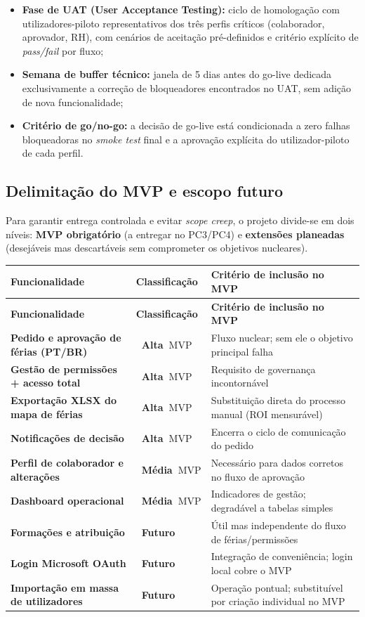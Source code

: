 \documentclass[11pt,a4paper,twoside]{article}
\newcommand{\taghi}  {{\setlength{\fboxsep}{1.5pt}\colorbox{TAGHI}  {\scriptsize\sffamily\bfseries\color{white}~Alta~}}}
\newcommand{\tagmed} {{\setlength{\fboxsep}{1.5pt}\colorbox{TAGMED} {\scriptsize\sffamily\bfseries\color{white}~Média~}}}
\newcommand{\tagn}[1]{{\setlength{\fboxsep}{1.5pt}\colorbox{TAGNEUTRAL}{\scriptsize\sffamily\bfseries\color{white}~#1~}}}
\newcommand{\tH}[1]{\textbf{\sffamily\small\color{white}#1}}
\newcommand{\theadrow}{\rowcolor{ACCENT}}
\begin{document}
\begin{itemize}
  \item \textbf{Fase de UAT (User Acceptance Testing):} ciclo de homologação com utilizadores-piloto representativos dos três perfis críticos (colaborador, aprovador, RH), com cenários de aceitação pré-definidos e critério explícito de \textit{pass/fail} por fluxo;
  \item \textbf{Semana de buffer técnico:} janela de 5 dias antes do go-live dedicada exclusivamente a correção de bloqueadores encontrados no UAT, sem adição de nova funcionalidade;
  \item \textbf{Critério de go/no-go:} a decisão de go-live está condicionada a zero falhas bloqueadoras no \textit{smoke test} final e a aprovação explícita do utilizador-piloto de cada perfil.
\end{itemize}

\subsection{Delimitação do MVP e escopo futuro}

Para garantir entrega controlada e evitar \textit{scope creep}, o projeto divide-se em dois níveis: \textbf{MVP obrigatório} (a entregar no PC3/PC4) e \textbf{extensões planeadas} (desejáveis mas descartáveis sem comprometer os objetivos nucleares).

\begin{longtable}{>{\small\bfseries}p{4.2cm} >{\small\centering\arraybackslash}p{2.0cm} >{\small}p{7.8cm}}
\theadrow
\tH{Funcionalidade} & \tH{Classificação} & \tH{Critério de inclusão no MVP} \\
\midrule
\endfirsthead
\theadrow
\tH{Funcionalidade} & \tH{Classificação} & \tH{Critério de inclusão no MVP} \\
\midrule
\endhead
Pedido e aprovação de férias (PT/BR) & \taghi MVP & Fluxo nuclear; sem ele o objetivo principal falha \\
Gestão de permissões + acesso total & \taghi MVP & Requisito de governança incontornável \\
Exportação XLSX do mapa de férias & \taghi MVP & Substituição direta do processo manual (ROI mensurável) \\
Notificações de decisão & \taghi MVP & Encerra o ciclo de comunicação do pedido \\
Perfil de colaborador e alterações & \tagmed MVP & Necessário para dados corretos no fluxo de aprovação \\
Dashboard operacional & \tagmed MVP & Indicadores de gestão; degradável a tabelas simples \\
Formações e atribuição & \tagn{Futuro} & Útil mas independente do fluxo de férias/permissões \\
Login Microsoft OAuth & \tagn{Futuro} & Integração de conveniência; login local cobre o MVP \\
Importação em massa de utilizadores & \tagn{Futuro} & Operação pontual; substituível por criação individual no MVP \\
\bottomrule
\end{longtable}
\end{document}
